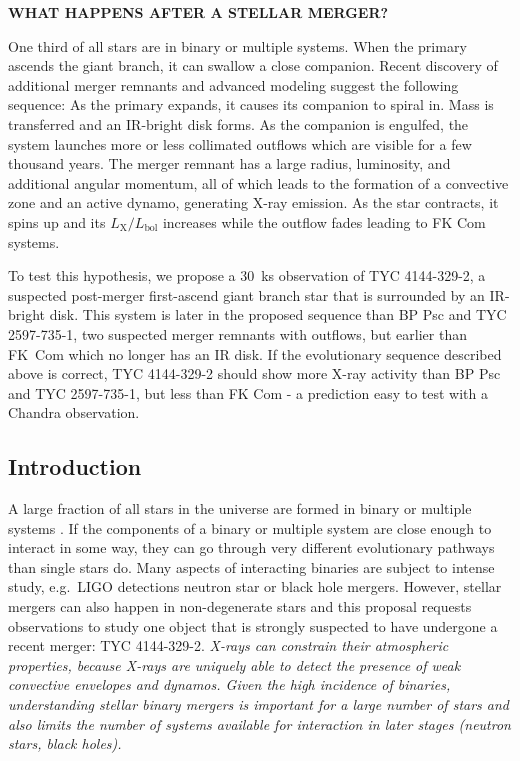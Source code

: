 \documentclass[letterpaper,11pt]{article}
\begin{document}
\pagestyle{plain}


 

\begin{center} 
\bfseries\uppercase{%
What happens after a stellar merger?
}
\end{center}

One third of all stars are in binary or multiple systems. When the primary ascends the giant branch, it can swallow a close companion. Recent discovery of additional merger remnants and advanced modeling suggest the following sequence: As the primary expands, it causes its companion to spiral in. Mass is transferred and an IR-bright disk forms. As the companion is engulfed, the system launches more or less collimated outflows which are visible for a few thousand years. The merger remnant has a large radius, luminosity, and additional angular momentum, all of which leads to the formation of a convective zone and an active dynamo, generating X-ray emission. As the star contracts, it spins up and its $L_\mathrm{X}/L_\mathrm{bol}$ increases while the outflow fades leading to FK Com systems. 

To test this hypothesis, we propose a 30~ks observation of TYC 4144-329-2, a suspected post-merger first-ascend giant branch star that is surrounded by an IR-bright disk. This system is later in the proposed sequence than BP Psc and  TYC 2597-735-1, two suspected merger remnants with outflows, but earlier than FK~Com which no longer has an IR disk. If the evolutionary sequence described above is correct, TYC 4144-329-2 should show more X-ray activity than BP Psc and  TYC 2597-735-1, but less than FK Com - a prediction easy to test with a Chandra observation.


\subsection*{Introduction}
A large fraction of all stars in the universe are formed in binary or multiple systems \cite{Raghavan+2010}. If the components of a binary or multiple system are close enough to interact in some way, they can go through very different evolutionary pathways than single stars do. Many aspects of interacting binaries are subject to intense study, e.g.\ LIGO detections neutron star or black hole mergers. However, stellar mergers can also happen in non-degenerate stars and this proposal requests observations to study one object that is strongly suspected to have undergone a recent merger: TYC 4144-329-2. \textit{X-rays can constrain their atmospheric properties, because X-rays are uniquely able to detect the presence of weak convective envelopes and dynamos. Given the high incidence of binaries, understanding stellar binary mergers is important for a large number of stars and also limits the number of systems available for interaction in later stages (neutron stars, black holes).}
\end{document}
